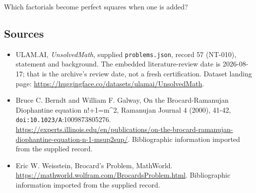\documentclass[11pt,a4paper]{article}
\begin{document}
Which factorials become perfect squares when one is added?

\subsection{Sources}

{\small

\begin{itemize}

\item[\hypertarget{source:57:1}{S1}] ULAM.AI, \emph{UnsolvedMath}, supplied \texttt{problems.json}, record 57 (NT-010), statement and background. The embedded literature-review date is 2026-08-17; that is the archive’s review date, not a fresh certification. Dataset landing page: \url{https://huggingface.co/datasets/ulamai/UnsolvedMath}.

\item[\hypertarget{source:57:2}{S2}] Bruce C. Berndt and William F. Galway, On the Brocard-Ramanujan Diophantine equation n!+1=m\textasciicircum{}2, Ramanujan Journal 4 (2000), 41-42, \nolinkurl{doi:10.1023/A}:1009873805276. \url{https://experts.illinois.edu/en/publications/on-the-brocard-ramanujan-diophantine-equation-n-1-msup2sup/}. Bibliographic information imported from the supplied record.

\item[\hypertarget{source:57:3}{S3}] Eric W. Weisstein, Brocard's Problem, MathWorld. \url{https://mathworld.wolfram.com/BrocardsProblem.html}. Bibliographic information imported from the supplied record.

\end{itemize}

}

\label{end:57}
\end{document}
